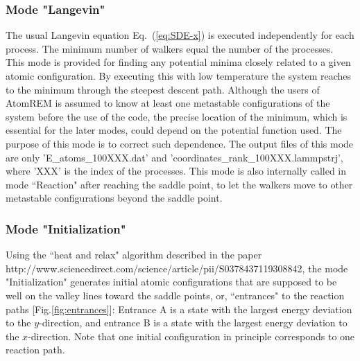 \documentclass[preprint,12pt]{elsarticle}
\begin{document}
  \subsubsection{Mode "Langevin"}
The usual Langevin equation Eq.~(\ref{eq:SDE-x}) is executed independently for each process. The minimum number of walkers equal the number of the processes. This mode is provided for finding any potential minima closely related to a given atomic configuration. By executing this with low temperature the system reaches to the minimum through the steepest descent path. Although the users of AtomREM is assumed to know at least one metastable configurations of the system before the use of the code, the precise location of the minimum, which is essential for the later modes, could depend on the potential function used. The purpose of this mode is to correct such dependence. The output files of this mode are only  ’E\_atoms\_100XXX.dat’ and ’coordinates\_rank\_100XXX.lammpstrj’, where 'XXX' is the index of the processes. This mode is also internally called in mode ``Reaction" after reaching the saddle point, to let the walkers move to other metastable configurations beyond the saddle point.

  \subsubsection{Mode "Initialization"}
Using the ``heat and relax" algorithm described in the paper http://www.sciencedirect.com/science/article/pii/S0378437119308842, the mode "Initialization" generates initial atomic configurations that are supposed to be well on the valley lines toward the saddle points, or, ``entrances" to the reaction paths [Fig.\ref{fig:entrances}]: Entrance A is a state with the largest energy deviation to the $y$-direction, and entrance B is a state with the largest energy deviation to the $x$-direction. Note that one initial configuration in principle corresponds to one reaction path.%
\end{document}
